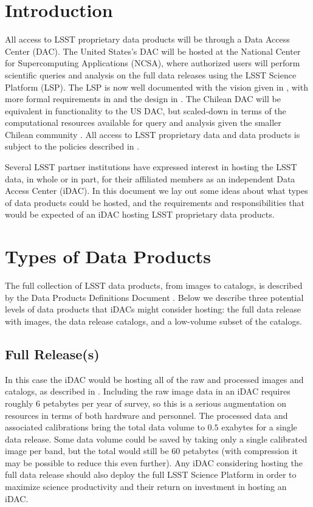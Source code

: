 
\section{Introduction}

All access to LSST proprietary data products will be through a Data Access Center (DAC). The United States's DAC will be hosted at the National Center for Supercomputing Applications (NCSA), where authorized users will perform scientific queries and analysis on the full data releases using the LSST Science Platform (LSP). The LSP is now well documented with the vision given in , with more formal requirements in  and the design in . The Chilean DAC will be equivalent in functionality to the US DAC, but scaled-down in terms of the computational resources available for query and analysis given the smaller Chilean community . All access to LSST proprietary data and data products is subject to the policies described in .

Several LSST partner institutions have expressed interest in hosting the LSST data, in whole or in part, for their affiliated members as an independent Data Access Center (iDAC). In this document we lay out some ideas about what types of data products could be hosted, and the requirements and responsibilities that would be expected of an iDAC hosting LSST proprietary data products.


\section{Types of Data Products}

The full collection of LSST data products, from images to catalogs, is described by the Data Products Definitions Document . Below we describe three potential levels of data products that iDACs might consider hosting: the full data release with images, the data release catalogs, and a low-volume subset of the catalogs.

\subsection{Full Release(s)}

In this case the iDAC would be hosting all of the raw and processed images and catalogs, as described in . Including the raw image data in an iDAC requires roughly $6$ petabytes per year of survey, so this is a serious augmentation on resources in terms of both hardware and personnel. The processed data and associated calibrations bring the total data volume to $0.5$ exabytes for a single data release. Some data volume could be saved by taking only a single calibrated image per band, but the total would still be $60$ petabytes (with compression it may be possible to reduce this even further). Any iDAC considering hosting the full data release should also deploy the full LSST Science Platform  in order to maximize science productivity and their return on investment in hosting an iDAC. 

